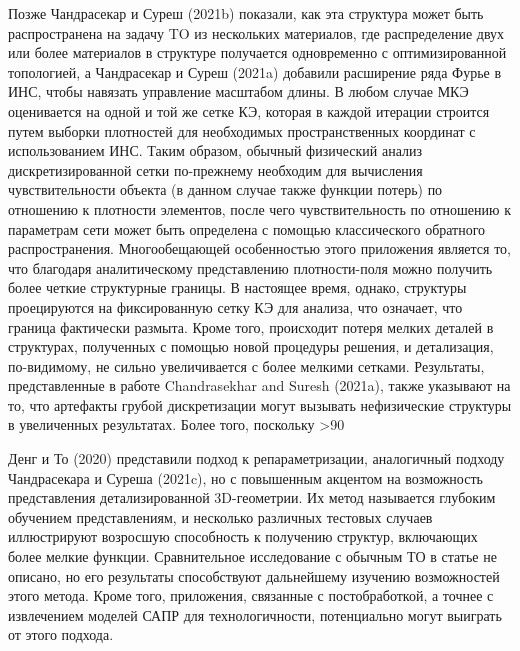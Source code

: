 Позже Чандрасекар и Суреш (2021b) показали, как эта структура может быть распространена на задачу TO из нескольких материалов, где распределение двух или более материалов в структуре получается одновременно с оптимизированной топологией, а Чандрасекар и Суреш (2021a) добавили расширение ряда Фурье в ИНС, чтобы навязать управление масштабом длины. В любом случае МКЭ оценивается на одной и той же сетке КЭ, которая в каждой итерации строится путем выборки плотностей для необходимых пространственных координат с использованием ИНС. Таким образом, обычный физический анализ дискретизированной сетки по-прежнему необходим для вычисления чувствительности объекта (в данном случае также функции потерь) по отношению к плотности элементов, после чего чувствительность по отношению к параметрам сети может быть определена с помощью классического обратного распространения. Многообещающей особенностью этого приложения является то, что благодаря аналитическому представлению плотности-поля можно получить более четкие структурные границы. В настоящее время, однако, структуры проецируются на фиксированную сетку КЭ для анализа, что означает, что граница фактически размыта. Кроме того, происходит потеря мелких деталей в структурах, полученных с помощью новой процедуры решения, и детализация, по-видимому, не сильно увеличивается с более мелкими сетками. Результаты, представленные в работе Chandrasekhar and Suresh (2021a), также указывают на то, что артефакты грубой дискретизации могут вызывать нефизические структуры в увеличенных результатах. Более того, поскольку >90%

Денг и То (2020) представили подход к репараметризации, аналогичный подходу Чандрасекара и Суреша (2021c), но с повышенным акцентом на возможность представления детализированной 3D-геометрии. Их метод называется глубоким обучением представлениям, и несколько различных тестовых случаев иллюстрируют возросшую способность к получению структур, включающих более мелкие функции. Сравнительное исследование с обычным ТО в статье не описано, но его результаты способствуют дальнейшему изучению возможностей этого метода. Кроме того, приложения, связанные с постобработкой, а точнее с извлечением моделей САПР для технологичности, потенциально могут выиграть от этого подхода.

